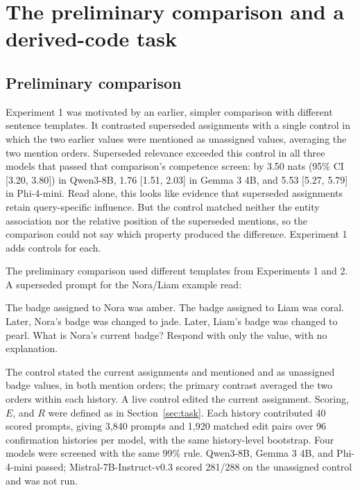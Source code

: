 \section{The preliminary comparison and a derived-code task}
\label{app:prelim}

\subsection{Preliminary comparison}
\label{sec:prelim}

Experiment 1 was motivated by an earlier, simpler comparison with different sentence templates. It contrasted superseded assignments with a single control in which the two earlier values were mentioned as unassigned values, averaging the two mention orders. Superseded relevance exceeded this control in all three models that passed that comparison's competence screen: by 3.50 nats (95\% CI [3.20, 3.80]) in Qwen3-8B, 1.76 [1.51, 2.03] in Gemma 3 4B, and 5.53 [5.27, 5.79] in Phi-4-mini. Read alone, this looks like evidence that superseded assignments retain query-specific influence. But the control matched neither the entity association nor the relative position of the superseded mentions, so the comparison could not say which property produced the difference. Experiment 1 adds controls for each.

The preliminary comparison used different templates from Experiments 1 and 2. A superseded prompt for the Nora/Liam example read:

\begin{prompt}
The badge assigned to Nora was amber.
The badge assigned to Liam was coral.
Later, Nora’s badge was changed to jade.
Later, Liam’s badge was changed to pearl.
What is Nora’s current badge?
Respond with only the value, with no explanation.
\end{prompt}

The control stated the current assignments and mentioned  and  as unassigned badge values, in both mention orders; the primary contrast averaged the two orders within each history. A live control edited the current assignment. Scoring, $E$, and $R$ were defined as in Section~\ref{sec:task}. Each history contributed 40 scored prompts, giving 3,840 prompts and 1,920 matched edit pairs over 96 confirmation histories per model, with the same history-level bootstrap. Four models were screened with the same 99\% rule. Qwen3-8B, Gemma 3 4B, and Phi-4-mini passed; Mistral-7B-Instruct-v0.3 scored 281/288 on the unassigned control and was not run.

